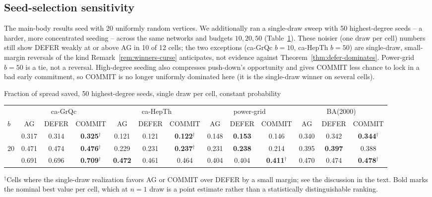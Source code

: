 \documentclass[ijoc,sglanonrev]{informs4}
\begin{document}
\subsection{Seed-selection sensitivity}

The main-body results seed with 20 uniformly random vertices. We
additionally ran a single-draw sweep with 50 highest-degree seeds -- a
harder, more concentrated seeding -- across the same networks and budgets
$10,20,50$ (Table~\ref{tab:defer-degree-seeds}). These noisier (one draw
per cell) numbers still show DEFER weakly at or above AG in 10 of 12
cells; the two exceptions (ca-GrQc $b=10$, ca-HepTh $b=50$) are
single-draw, small-margin reversals of the kind
Remark~\ref{rem:winners-curse} anticipates, not evidence against
Theorem~\ref{thm:defer-dominates}. Power-grid $b=50$ is a tie, not a
reversal. High-degree seeding also compresses push-down's opportunity and
gives COMMIT less chance to lock in a bad early commitment, so COMMIT is
no longer uniformly dominated here (it is the single-draw winner on
several cells).

\begin{table}[h]
\TABLE
{Fraction of spread saved, 50 highest-degree seeds, single draw per cell, constant probability\label{tab:defer-degree-seeds}}
{\begin{tabular}{@{}lcccccccccccc@{}}
\hline
\up & \multicolumn{3}{c}{ca-GrQc} & \multicolumn{3}{c}{ca-HepTh} & \multicolumn{3}{c}{power-grid} & \multicolumn{3}{c}{BA(2000)} \\
$b$ & AG & DEFER & COMMIT & AG & DEFER & COMMIT & AG & DEFER & COMMIT & AG & DEFER & COMMIT \\
\hline
\up 10 & 0.317 & 0.314 & \textbf{0.325}$^\dagger$ & 0.121 & 0.121 & \textbf{0.122}$^\dagger$ & 0.148 & \textbf{0.153} & 0.146 & 0.340 & 0.342 & \textbf{0.344}$^\dagger$ \\
20 & 0.471 & 0.474 & \textbf{0.476}$^\dagger$ & 0.229 & 0.231 & \textbf{0.237}$^\dagger$ & 0.231 & \textbf{0.238} & 0.214 & 0.395 & \textbf{0.397} & 0.388 \\
\down 50 & 0.691 & 0.696 & \textbf{0.709}$^\dagger$ & \textbf{0.472} & 0.461 & 0.464 & 0.404 & 0.404 & \textbf{0.411}$^\dagger$ & 0.470 & 0.474 & \textbf{0.478}$^\dagger$ \\
\hline
\end{tabular}}
{$^\dagger$Cells where the single-draw realization favors AG or COMMIT
over DEFER by a small margin; see the discussion in the text. Bold marks
the nominal best value per cell, which at $n=1$ draw is a point estimate
rather than a statistically distinguishable ranking.}
\end{table}
\end{document}
